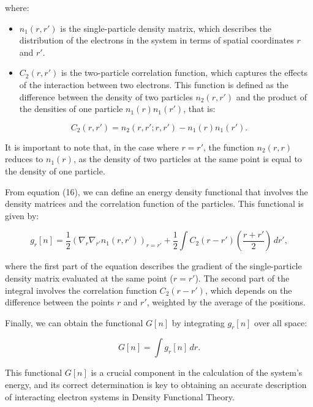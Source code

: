 \documentclass[%
 preprint, linenumbers,
 amsmath,amssymb,
 aps, physrev,
]{revtex4-2}
\begin{document}
where:

\begin{itemize}
    \item \( n_1(r, r') \) is the single-particle density matrix, which describes the distribution of the electrons in the system in terms of spatial coordinates \( r \) and \( r' \).
    \item \( C_2(r, r') \) is the two-particle correlation function, which captures the effects of the interaction between two electrons. This function is defined as the difference between the density of two particles \( n_2(r, r') \) and the product of the densities of one particle \( n_1(r) n_1(r') \), that is:
\end{itemize}

\begin{equation}
C_2(r, r') = n_2(r, r'; r, r') - n_1(r) n_1(r').
\end{equation}

It is important to note that, in the case where \( r = r' \), the function \( n_2(r, r) \) reduces to \( n_1(r) \), as the density of two particles at the same point is equal to the density of one particle.

From equation (16), we can define an energy density functional that involves the density matrices and the correlation function of the particles. This functional is given by:

\begin{equation}
g_r[n] = \frac{1}{2} \left( \nabla_r \nabla_{r'} n_1(r, r') \right)_{r=r'} + \frac{1}{2} \int C_2(r - r') \left( \frac{r + r'}{2} \right) \, dr',
\end{equation}

where the first part of the equation describes the gradient of the single-particle density matrix evaluated at the same point (\( r = r' \)). The second part of the integral involves the correlation function \( C_2(r - r') \), which depends on the difference between the points \( r \) and \( r' \), weighted by the average of the positions.

Finally, we can obtain the functional \( G[n] \) by integrating \( g_r[n] \) over all space:

\begin{equation}
G[n] = \int g_r[n] \, dr.
\end{equation}

This functional \( G[n] \) is a crucial component in the calculation of the system's energy, and its correct determination is key to obtaining an accurate description of interacting electron systems in Density Functional Theory.
\end{document}
